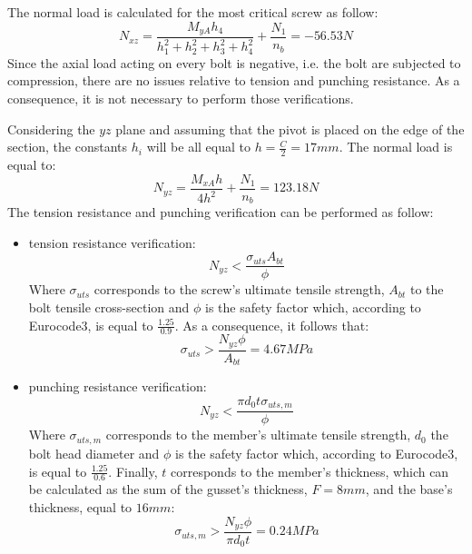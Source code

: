 The normal load is calculated for the most critical screw as follow:\\
\begin{equation*}
    N_{xz} = \frac{M_{yA}h_{4}}{h_{1}^{2}+h_{2}^{2}+h_{3}^{2}+h_{4}^{2}} + \frac{N_{1}}{n_{b}} = - 56.53 N
\end{equation*}
Since the axial load acting on every bolt is negative, i.e. the bolt are subjected to compression, there are no issues relative to tension and punching resistance. As a consequence, it is not necessary to perform those verifications. 

Considering the $yz$ plane and assuming that the pivot is placed on the edge of the section, the constants $h_{i}$ will be all equal to $h = \frac{C}{2} = 17 mm$.
The normal load is equal to:
\begin{equation*}
    N_{yz} = \frac{M_{xA}h}{4h^{2}} + \frac{N_{1}}{n_{b}} = 123.18 N
\end{equation*}
The tension resistance and punching verification can be performed as follow:
\begin{itemize}
    \item tension resistance verification:
    \begin{equation*}
        N_{yz} < \frac{\sigma_{uts}A_{bt}}{\phi}
    \end{equation*}
    Where $\sigma_{uts}$ corresponds to the screw's ultimate tensile strength, $A_{bt}$ to the bolt tensile cross-section and $\phi$ is the safety factor which, according to Eurocode3, is equal to $\frac{1.25}{0.9}$. As a consequence, it follows that:
    \begin{equation*}
       \sigma_{uts} > \frac{N_{yz}\phi}{A_{bt}} = 4.67 MPa
    \end{equation*}
    \item punching resistance verification:
    \begin{equation*}
        N_{yz} < \frac{\pi d_{0} t \sigma_{uts,m}}{\phi}
    \end{equation*}
    Where $\sigma_{uts,m}$ corresponds to the member's ultimate tensile strength, $d_{0}$ the bolt head diameter and $\phi$ is the safety factor which, according to Eurocode3, is equal to $\frac{1.25}{0.6}$. Finally, $t$ corresponds to the member's thickness, which can be calculated as the sum of the gusset's thickness, $F = 8 mm$, and the base's thickness, equal to $16 mm$:
     \begin{equation*}
       \sigma_{uts,m} > \frac{N_{yz}\phi}{\pi d_{0}t} = 0.24 MPa
    \end{equation*}
\end{itemize}


